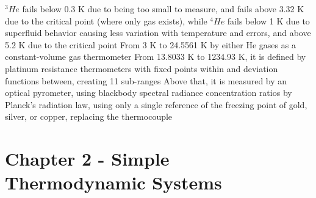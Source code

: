 \begin{outline*}
\3 $^3He$ fails below 0.3 K due to being too small to measure, and fails above 3.32 K due to the critical point (where only gas exists), while $^4He$ fails below 1 K due to superfluid behavior causing less variation with temperature and errors, and above 5.2 K due to the critical point
\2 From 3 K to 24.5561 K by either He gases as a constant-volume gas thermometer
\2 From 13.8033 K to 1234.93 K, it is defined by platinum resistance thermometers with fixed points within and deviation functions between, creating 11 sub-ranges
\2 Above that, it is measured by an optical pyrometer, using blackbody spectral radiance concentration ratios by Planck's radiation law, using only a single reference of the freezing point of gold, silver, or copper, replacing the thermocouple
\end{outline*}
\section{Chapter 2 - Simple Thermodynamic Systems}
